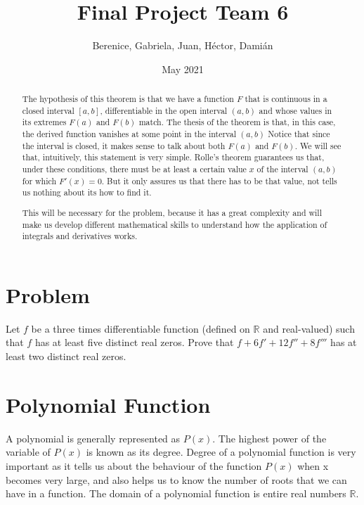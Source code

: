 \documentclass{article}
\title{Final Project Team 6}
\author{Berenice, Gabriela, Juan, Héctor, Damián}
\date{May 2021}
\begin{document}
    \maketitle
    \tableofcontents
    \newpage



    \begin{abstract}
        The hypothesis of this theorem is that we have a function $F$ that is continuous in a closed interval $[a, b]$, differentiable in the open interval $(a, b)$ and whose values in its extremes $F(a)$ and $F(b)$ match.
        The thesis of the theorem is that, in this case, the derived function vanishes at some point in the interval $(a, b)$
        Notice that since the interval is closed, it makes sense to talk about both $F(a)$ and $F(b)$. We will see that, intuitively, this statement is very simple.
        Rolle's theorem guarantees us that, under these conditions, there must be at least a certain value $x$ of the interval $(a, b)$ for which $F'(x) = 0$. But it only assures us that there has to be that value, not tells us nothing about its how to find it.

        This will be necessary for the problem, because it has a great complexity and will make us develop different mathematical skills to understand how the application of integrals and derivatives works.
    \end{abstract}

    \section{Problem}
    Let $f$ be a three times differentiable function (defined on $\mathbb{R}$
    and real-valued) such that $f$ has at least five distinct real zeros. 
    Prove that $f + 6f' + 12f'' + 8f'''$ has at least two distinct real zeros.
    

    \section{Polynomial Function}
    A polynomial is generally represented as $P(x)$. The highest power of the variable of $P(x)$ is known as its degree. Degree of a polynomial function is very important as it tells us about the behaviour of the function $P(x)$ when x becomes very large, and also helps us to know the number of roots that we can have in a function. The domain of a polynomial function is entire real numbers $\mathbb{R} $.
\end{document}
